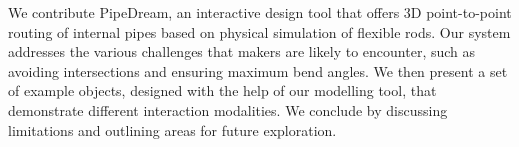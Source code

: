 We contribute PipeDream, an interactive design tool that offers 3D point-to-point routing of internal pipes based on physical simulation of flexible rods. Our system addresses the various challenges that makers are likely to encounter, such as avoiding intersections and ensuring maximum bend angles. We then present a set of example objects, designed with the help of our modelling tool, that demonstrate different interaction modalities. We conclude by discussing limitations and outlining areas for future exploration. 

